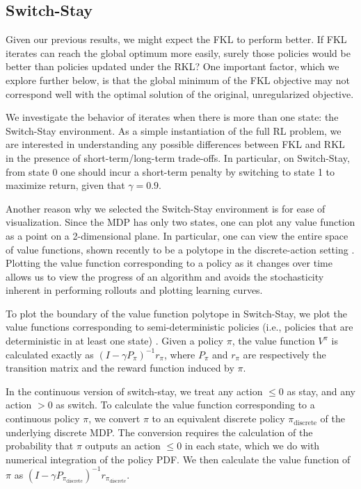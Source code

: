 \documentclass[twoside,11pt]{article}
\newcommand{\vpi}{V^\pi}
\begin{document}
\subsection{Switch-Stay}
Given our previous results, we might expect the FKL to perform better. If FKL iterates can reach the global optimum more easily, surely those policies would be better than policies updated under the RKL? One important factor, which we explore further below, is that the global minimum of the FKL objective may not correspond well with the optimal solution of the original, unregularized objective. 

We investigate the behavior of iterates when there is more than one state: the Switch-Stay environment. As a simple instantiation of the full RL problem, we are interested in understanding any possible differences between FKL and RKL in the presence of short-term/long-term trade-offs. In particular, on Switch-Stay, from state 0 one should incur a short-term penalty by switching to state 1 to maximize return, given that $\gamma = 0.9$.

Another reason why we selected the Switch-Stay environment is for ease of visualization. Since the MDP has only two states, one can plot any value function as a point on a 2-dimensional plane. In particular, one can view the entire space of value functions, shown recently to be a polytope in the discrete-action setting \citep{dadashi2019value}. Plotting the value function corresponding to a policy as it changes over time allows us to view the progress of an algorithm and avoids the stochasticity inherent in performing rollouts and plotting learning curves.

To plot the boundary of the value function polytope in Switch-Stay, we plot the value functions corresponding to semi-deterministic policies (i.e., policies that are deterministic in at least one state) \citep{dadashi2019value}. Given a policy $\pi$, the value function $\vpi$ is calculated exactly as $(I - \gamma P_\pi)^{-1}r_\pi$, where $P_\pi$ and $r_\pi$ are respectively the transition matrix and the reward function induced by $\pi$. 

In the continuous version of switch-stay, we treat any action $ \leq 0$ as stay, and any action $ > 0$ as switch. To calculate the value function corresponding to a continuous policy $\pi$, we convert $\pi$ to an equivalent discrete policy $\pi_{\mathrm{discrete}}$ of the underlying discrete MDP. The conversion requires the calculation of the probability that $\pi$ outputs an action $\leq 0$ in each state, which we do with numerical integration of the policy PDF. We then calculate the value function of $\pi$ as $(I - \gamma P_{\pi_{\mathrm{discrete}}})^{-1}r_{\pi_{\mathrm{discrete}}}$.
\end{document}
